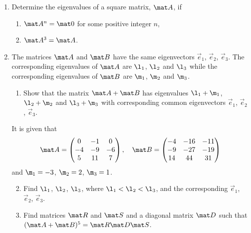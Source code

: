 \begin{problem}
    \begin{enumerate}
        \item Determine the eigenvalues of a square matrix, $\mat A$, if
        \begin{enumerate}
            \item $\mat A^n = \mat 0$ for some positive integer $n$,
            \item $\mat A^3 = \mat A$.
        \end{enumerate}
        \item The matrices $\mat A$ and $\mat B$ have the same eigenvectors $\vec e_1$, $\vec e_2$, $\vec e_3$. The corresponding eigenvalues of $\mat A$ are $\l_1$, $\l_2$ and $\l_3$ while the corresponding eigenvalues of $\mat B$ are $\m_1$, $\m_2$ and $\m_3$.
        \begin{enumerate}
            \item Show that the matrix $\mat A + \mat B$ has eigenvalues $\l_1 + \m_1$, $\l_2 + \m_2$ and $\l_3 + \m_3$ with corresponding common eigenvectors $\vec e_1$, $\vec e_2$, $\vec e_3$.
        \end{enumerate}

        It is given that \[\mat A = \begin{pmatrix}0 & -1 & 0 \\ -4 & -9 & -6 \\ 5 & 11 & 7\end{pmatrix}, \quad \mat B = \begin{pmatrix}-4 & -16 & -11 \\ -9 & -27 & -19 \\ 14 & 44 & 31\end{pmatrix}\] and $\m_1 = -3$, $\m_2 = 2$, $\m_3 = 1$.

        \begin{enumerate}
            \setcounter{enumii}{1}
            \item Find $\l_1$, $\l_2$, $\l_3$, where $\l_1 < \l_2 < \l_3$, and the corresponding $\vec e_1$, $\vec e_2$, $\vec e_3$.
            \item Find matrices $\mat R$ and $\mat S$ and a diagonal matrix $\mat D$ such that $(\mat A + \mat B)^5 = \mat R \mat D \mat S$.
        \end{enumerate}
    \end{enumerate}
\end{problem}
